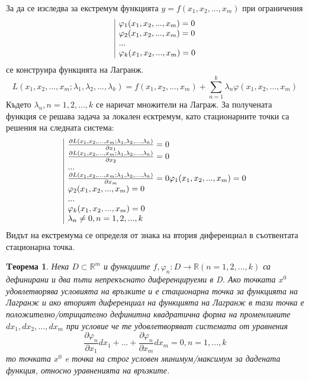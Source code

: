 \documentclass[a4paper,fleqn,12pt]{article}
\newtheorem{theorem}{Tеорема}[subsection]
\theoremstyle{definition}
\begin{document}
За да се изследва за екстремум функцията $y = f(x_1,x_2,..., x_m)$ при ограничения 
$$
\begin{array}{|l@{}}
\varphi_1 (x_1, x_2, ..., x_m) = 0\\
\varphi_2 (x_1, x_2, ..., x_m) = 0\\
... \\
\varphi_k (x_1, x_2, ..., x_m) = 0\\
\end{array}
$$
се конструира функцията на Лагранж.
$$L(x_1, x_2, ..., x_m ; \lambda_1, \lambda_2, ..., \lambda_k) = f(x_1, x_2, ..., x_m) + \sum_{n=1}^k \lambda_n \varphi(x_1, x_2, ..., x_m)$$
Където $\lambda_n, n = 1, 2, ..., k$ се наричат множители на Лаграж. За получената функция се решава задача за локален есктремум, като стационарните точки са решения на следната система:
$$
\begin{array}{|l@{}}
\frac{\partial L(x_1, x_2, ..., x_m ; \lambda_1, \lambda_2, ..., \lambda_k)}{\partial x_1} = 0 \\
\frac{\partial L(x_1, x_2, ..., x_m ; \lambda_1, \lambda_2, ..., \lambda_k)}{\partial x_2} = 0 \\
... \\
\frac{\partial L(x_1, x_2, ..., x_m ; \lambda_1, \lambda_2, ..., \lambda_k)}{\partial x_m} = 0
\varphi_1 (x_1, x_2, ..., x_m) = 0\\
\varphi_2 (x_1, x_2, ..., x_m) = 0\\
... \\
\varphi_k (x_1, x_2, ..., x_m) = 0\\
\lambda_n \neq 0, n = 1, 2, ..., k
\end{array}
$$
Видът на екстремума се определя от знака на втория диференциал в съотвентата стационарна точка.

\begin{theorem}
Нека $D \subset \mathbb{R}^m$ и функциите $f, \varphi_n : D \to \mathbb{R}(n = 1,2, ..., k)$ са дефинирани и два пъти непрекъснато диференцируеми в D. Ако точката $x^0$ удовлетворява условията на връзките и е стационарна точка за функцията на Лагранж и ако вторият диференциал на функцията на Лагранж в тази точка е положително/отрицателно дефинитна квадратична форма на променливите $dx_1, dx_2, ..., dx_m$ при условие че те удовлетворяват системата от уравнения 
$$\frac{\partial \varphi_n}{\partial x_1} dx_1 + ... + \frac{\partial \varphi_n}{\partial x_m} dx_m = 0, n = 1, ..., k$$
то точката $x^0$ e точка на строг условен минимум/максимум за дадената функция, относно уравненията на връзките. 
\end{theorem}
\end{document}
